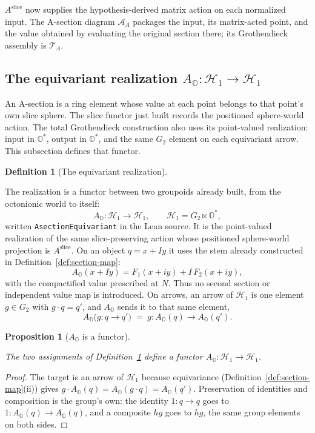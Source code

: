 \documentclass[11pt]{article}
\newcommand{\OO}{\mathbb{O}}
\providecommand{\Gtwo}{G_2}
\providecommand{\lean}[1]{}
\providecommand{\uses}[1]{}
\theoremstyle{plain}
\newtheorem{proposition}[theorem]{Proposition}
\theoremstyle{definition}
\newtheorem{definition}[theorem]{Definition}
\theoremstyle{remark}
\begin{document}
$A^{\mathrm{slice}}$ now supplies the hypothesis-derived matrix action on
each normalized input. The A-section diagram $\mathcal A_A$ packages the
input, its matrix-acted point, and the value obtained by evaluating the
original section there; its Grothendieck assembly is $\mathcal T_A$.


\subsection*{The equivariant realization $A_{\OO}:\mathcal H_1\to\mathcal H_1$}

An A-section is a ring element whose value at each point belongs to that
point's own slice sphere. The slice functor just built records the
positioned sphere-world action. The total Grothendieck construction also
uses its point-valued realization: input in $\OO^{*}$, output in
$\OO^{*}$, and the same $G_2$ element on each equivariant arrow. This
subsection defines that functor.

\begin{definition}[The equivariant realization]\label{def:equivariant}
\lean{ASection.AsectionEquivariant}
\uses{def:aslice, def:section-map, def:two-worlds}
The realization is a functor between two groupoids already built, from the
octonionic world to itself:
\[
  A_{\OO}:\mathcal H_1\longrightarrow\mathcal H_1,
  \qquad \mathcal H_1=\Gtwo\ltimes\OO^{*},
\]
written \texttt{AsectionEquivariant} in the Lean source. It is the
point-valued realization of the same slice-preserving action whose
positioned sphere-world projection is $A^{\mathrm{slice}}$. On an object
$q=x+Iy$ it uses the stem already constructed in
Definition~\ref{def:section-map}:
\[
  A_{\OO}(x+Iy)=F_1(x+iy)+I\,F_2(x+iy),
\]
with the compactified value prescribed at $N$. Thus no second section or
independent value map is introduced. On arrows, an arrow of $\mathcal H_1$
is one element $g\in G_2$ with $g\cdot q=q'$, and $A_{\OO}$ sends it to
that same element,
\[
  A_{\OO}\bigl(g:q\to q'\bigr)\;=\;
  g:A_{\OO}(q)\to A_{\OO}(q').
\]
\end{definition}

\begin{proposition}[$A_{\OO}$ is a functor]\label{prop:equivariant-functor}
\uses{def:equivariant}
The two assignments of Definition~\ref{def:equivariant} define a functor
$A_{\OO}:\mathcal H_1\to\mathcal H_1$.
\end{proposition}

\begin{proof}
The target is an arrow of $\mathcal H_1$ because equivariance
(Definition~\ref{def:section-map}(ii)) gives
$g\cdot A_{\OO}(q)=A_{\OO}(g\cdot q)=A_{\OO}(q')$. Preservation of identities
and composition is the group's own: the identity $1:q\to q$ goes to
$1:A_{\OO}(q)\to A_{\OO}(q)$,
and a composite $hg$ goes to $hg$, the same group elements on both sides.
\end{proof}
\end{document}
